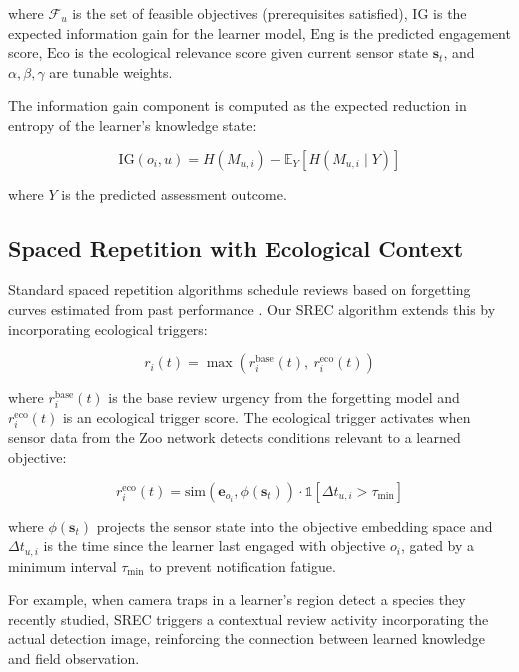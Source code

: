 \documentclass[11pt,a4paper]{article}
\begin{document}
\noindent where $\mathcal{F}_u$ is the set of feasible objectives (prerequisites satisfied), $\text{IG}$ is the expected information gain for the learner model, $\text{Eng}$ is the predicted engagement score, $\text{Eco}$ is the ecological relevance score given current sensor state $\mathbf{s}_t$, and $\alpha, \beta, \gamma$ are tunable weights.

The information gain component is computed as the expected reduction in entropy of the learner's knowledge state:

\begin{equation}
    \text{IG}(o_i, u) = H(M_{u,i}) - \mathbb{E}_{Y}\left[H(M_{u,i} \mid Y)\right]
\end{equation}

\noindent where $Y$ is the predicted assessment outcome.

\subsection{Spaced Repetition with Ecological Context}
\label{sec:srec}

Standard spaced repetition algorithms schedule reviews based on forgetting curves estimated from past performance \citep{settles2016trainable}.
Our SREC algorithm extends this by incorporating ecological triggers:

\begin{equation}
    r_i(t) = \max\left(r_i^{\text{base}}(t),\ r_i^{\text{eco}}(t)\right)
\end{equation}

\noindent where $r_i^{\text{base}}(t)$ is the base review urgency from the forgetting model and $r_i^{\text{eco}}(t)$ is an ecological trigger score.
The ecological trigger activates when sensor data from the Zoo network detects conditions relevant to a learned objective:

\begin{equation}
    r_i^{\text{eco}}(t) = \text{sim}(\mathbf{e}_{o_i}, \phi(\mathbf{s}_t)) \cdot \mathbb{1}[\Delta t_{u,i} > \tau_{\min}]
\end{equation}

\noindent where $\phi(\mathbf{s}_t)$ projects the sensor state into the objective embedding space and $\Delta t_{u,i}$ is the time since the learner last engaged with objective $o_i$, gated by a minimum interval $\tau_{\min}$ to prevent notification fatigue.

For example, when camera traps in a learner's region detect a species they recently studied, SREC triggers a contextual review activity incorporating the actual detection image, reinforcing the connection between learned knowledge and field observation.
\end{document}
